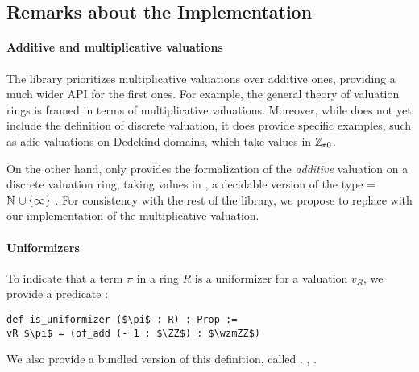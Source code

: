 \documentclass[sigplan,10pt, nonacm, review]{acmart}
\begin{document}
\subsection{Remarks about the Implementation}\label{subsec:implementation}

\paragraph{Additive and multiplicative valuations}
The \mathlib library prioritizes multiplicative valuations over additive ones, providing a much wider API for the first ones. For example, the general theory of valuation rings\href{https://leanprover-community.github.io/mathlib_docs/ring_theory/valuation/valuation_ring.html#valuation_ring.valuation}{\extlink} is framed in terms of multiplicative valuations. Moreover, while \mathlib does not yet include the definition of discrete valuation, it does provide specific examples, such as adic valuations on Dedekind domains, which take values in $\mathbb{Z}_{\mathtt{m}0}$.

On the other hand, \mathlib only provides the formalization of the \emph{additive} valuation \href{https://leanprover-community.github.io/mathlib_docs/ring_theory/discrete_valuation_ring/basic.html#discrete_valuation_ring.add_val}{\extlink} on a discrete valuation ring, taking values in , a decidable version of the type =\,$\mathbb{N}\mathtt{\ \cup \,\{\infty\}\ }$. 
For consistency with the rest of the library, we propose to replace  with our implementation of the multiplicative valuation.


\paragraph{Uniformizers}
To indicate that a term \code{(}$\pi$ in a ring $R$ is a uniformizer for a valuation $v_R$, we provide a predicate :\href{https://github.com/LCFT-Lean/local_fields/blob/76ad487d09babdb0018f394a5634526637ee014a/src/discrete_valuation_ring/basic.lean#L133}{\extlink}
\begin{lstlisting}
def is_uniformizer ($\pi$ : R) : Prop := 
vR $\pi$ = (of_add (- 1 : $\ZZ$) : $\wzmZZ$)
\end{lstlisting}

We also provide a bundled version of this definition, called \href{https://github.com/LCFT-Lean/local_fields/blob/76ad487d09babdb0018f394a5634526637ee014a/src/discrete_valuation_ring/basic.lean#L144}{\extlink}.  ,  . 
\end{document}
